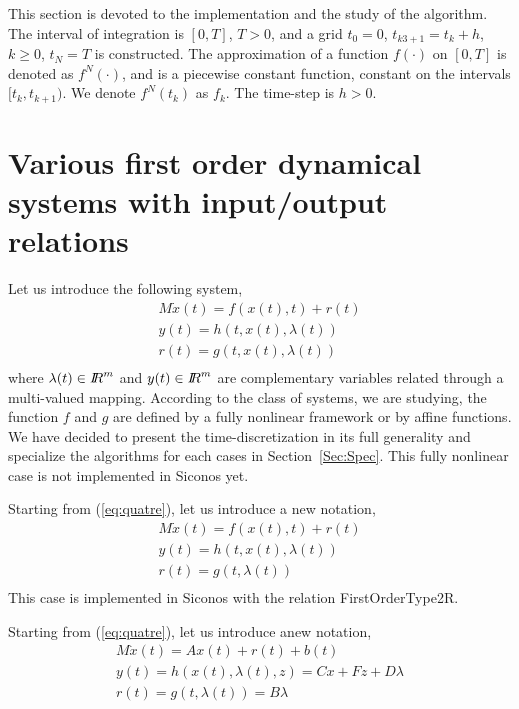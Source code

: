  This section is devoted to the implementation and the study  of the algorithm. The interval of integration is $[0,T]$, $T>0$, and a grid $t_{0}=0$, $t_{k3+1}=t_{k}+h$, $k \geq 0$, $t_{N}=T$ is constructed. The approximation of a function $f(\cdot)$ on $[0,T]$ is denoted as $f^{N}(\cdot)$, and is a piecewise constant function, constant on the intervals $[t_{k},t_{k+1})$. We denote $f^{N}(t_{k})$ as $f_{k}$. The time-step is $h>0$. 


\section{Various first order dynamical systems with input/output relations}


Let us introduce the following system, 
\begin{equation}
\begin{array}{l}
M \dot{x}(t) = f(x(t),t) + r(t)  \\[2mm]
y(t) = h(t,x(t),\lambda (t)) \\[2mm]
r(t) = g(t,x(t),\lambda (t) ) \\[2mm]
\end{array}
\label{first-DS}
\end{equation}
where $\lambda(t) \in \mbox{\rm $I\!\!R$}^m$  and $y(t) \in \mbox{\rm $I\!\!R$}^m$ are  complementary variables related through a multi-valued mapping.   According to the class of systems, we are studying, the function $f$ and $g$ are defined by a fully nonlinear framework or by affine functions. We have decided to present the time-discretization in its full generality and specialize the algorithms for each cases in Section~\ref{Sec:Spec}. This fully nonlinear case is not  implemented in Siconos yet.


Starting from  (\ref{eq:quatre}), let us introduce a new notation, 
\begin{equation}
\begin{array}{l}
M \dot{x}(t) = f(x(t),t) + r(t)  \\[2mm]
y(t) = h(t,x(t),\lambda (t)) \\[2mm]
r(t) = g(t,\lambda (t) ) \\[2mm]
\end{array}
\label{first-DS2}
\end{equation}
This case is implemented in Siconos with the relation FirstOrderType2R.

Starting from  (\ref{eq:quatre}), let us introduce anew notation, 
\begin{equation}
\begin{array}{l}
M \dot{x}(t) = Ax(t) + r(t)  +b(t)\\[2mm]
y(t) = h(x(t),\lambda (t),z) = Cx + Fz + D \lambda  \\[2mm]
r(t) = g(t,\lambda (t) ) = B \lambda \\[2mm]
\end{array}
\label{fisrt-DS3}
\end{equation}



